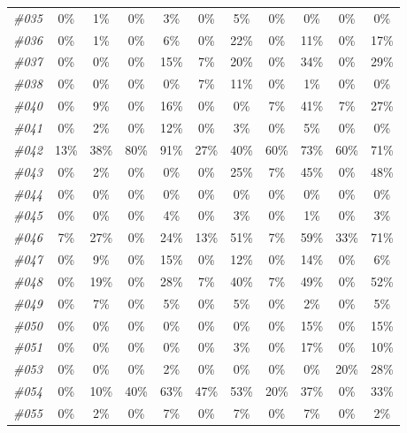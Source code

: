 \begin{table}[t]
\begin{tabular}{ccccccccccc}
    \textit{\#035} & 0\%   & 1\%   & 0\%   & 3\%   & 0\%   & 5\%   & 0\%   & 0\%   & 0\%   & 0\% \\
    \textit{\#036} & 0\%   & 1\%   & 0\%   & 6\%   & 0\%   & 22\%  & 0\%   & 11\%  & 0\%   & 17\% \\
    \textit{\#037} & 0\%   & 0\%   & 0\%   & 15\%  & 7\%   & 20\%  & 0\%   & 34\%  & 0\%   & 29\% \\
    \textit{\#038} & 0\%   & 0\%   & 0\%   & 0\%   & 7\%   & 11\%  & 0\%   & 1\%   & 0\%   & 0\% \\
    \textit{\#040} & 0\%   & 9\%   & 0\%   & 16\%  & 0\%   & 0\%   & 7\%   & 41\%  & 7\%   & 27\% \\
    \textit{\#041} & 0\%   & 2\%   & 0\%   & 12\%  & 0\%   & 3\%   & 0\%   & 5\%   & 0\%   & 0\% \\
    \textit{\#042} & 13\%  & 38\%  & 80\%  & 91\%  & 27\%  & 40\%  & 60\%  & 73\%  & 60\%  & 71\% \\
    \textit{\#043} & 0\%   & 2\%   & 0\%   & 0\%   & 0\%   & 25\%  & 7\%   & 45\%  & 0\%   & 48\% \\
    \textit{\#044} & 0\%   & 0\%   & 0\%   & 0\%   & 0\%   & 0\%   & 0\%   & 0\%   & 0\%   & 0\% \\
    \textit{\#045} & 0\%   & 0\%   & 0\%   & 4\%   & 0\%   & 3\%   & 0\%   & 1\%   & 0\%   & 3\% \\
    \textit{\#046} & 7\%   & 27\%  & 0\%   & 24\%  & 13\%  & 51\%  & 7\%   & 59\%  & 33\%  & 71\% \\
    \textit{\#047} & 0\%   & 9\%   & 0\%   & 15\%  & 0\%   & 12\%  & 0\%   & 14\%  & 0\%   & 6\% \\
    \textit{\#048} & 0\%   & 19\%  & 0\%   & 28\%  & 7\%   & 40\%  & 7\%   & 49\%  & 0\%   & 52\% \\
    \textit{\#049} & 0\%   & 7\%   & 0\%   & 5\%   & 0\%   & 5\%   & 0\%   & 2\%   & 0\%   & 5\% \\
    \textit{\#050} & 0\%   & 0\%   & 0\%   & 0\%   & 0\%   & 0\%   & 0\%   & 15\%  & 0\%   & 15\% \\
    \textit{\#051} & 0\%   & 0\%   & 0\%   & 0\%   & 0\%   & 3\%   & 0\%   & 17\%  & 0\%   & 10\% \\
    \textit{\#053} & 0\%   & 0\%   & 0\%   & 2\%   & 0\%   & 0\%   & 0\%   & 0\%   & 20\%  & 28\% \\
    \textit{\#054} & 0\%   & 10\%  & 40\%  & 63\%  & 47\%  & 53\%  & 20\%  & 37\%  & 0\%   & 33\% \\
    \textit{\#055} & 0\%   & 2\%   & 0\%   & 7\%   & 0\%   & 7\%   & 0\%   & 7\%   & 0\%   & 2\% \\
    \bottomrule
    \end{tabular}%
  \label{tab:exp_GalaxeaR1Pro_1}%
\end{table}%

